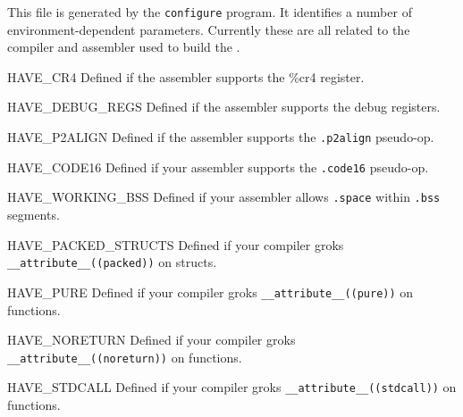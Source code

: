 \label{oskit-config-h}
\begin{apisyn}
\end{apisyn}
\begin{apidesc}
	This file is generated by the {\tt configure} program.
	It identifies a number of environment-dependent parameters.
	Currently these are all related to the compiler and assembler
	used to build the \oskit{}.

	\begin{icsymlist}
	\item[HAVE_CR4]
		Defined if the assembler supports the \%cr4 register.
	\item[HAVE_DEBUG_REGS]
		Defined if the assembler supports the debug registers.
	\item[HAVE_P2ALIGN]
		Defined if the assembler supports the {\tt.p2align} pseudo-op.
	\item[HAVE_CODE16]
		Defined if your assembler supports the {\tt.code16} pseudo-op.
	\item[HAVE_WORKING_BSS]
		Defined if your assembler allows {\tt.space} within
		{\tt.bss} segments.
	\item[HAVE_PACKED_STRUCTS]
		Defined if your compiler groks
		{\tt __attribute__((packed))} on structs.
	\item[HAVE_PURE]
		Defined if your compiler groks
		{\tt __attribute__((pure))} on functions.
	\item[HAVE_NORETURN]
		Defined if your compiler groks
		{\tt __attribute__((noreturn))} on functions.
	\item[HAVE_STDCALL]
		Defined if your compiler groks
		{\tt __attribute__((stdcall))} on functions.
	\end{icsymlist}
\end{apidesc}

